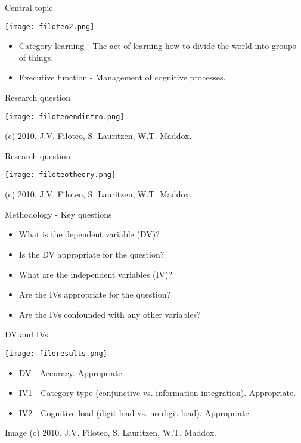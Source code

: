 \documentclass{beamer}
\begin{document}
\begin{frame}{Central topic}

\centerline{\texttt{[image: filoteo2.png]}}


\begin{itemize}
\item Category learning - The act of learning how to divide the world into groups of things.
\item Executive function - Management of cognitive processes.
\end{itemize}

\end{frame}



\begin{frame}{Research question}

\centerline{\texttt{[image: filoteoendintro.png]}}
\tiny (c) 2010. J.V. Filoteo, S. Lauritzen, W.T. Maddox. 
\end{frame}



\begin{frame}{Research question}

\centerline{\texttt{[image: filoteotheory.png]}}
\tiny (c) 2010. J.V. Filoteo, S. Lauritzen, W.T. Maddox. 
\end{frame}



\begin{frame}{Methodology - Key questions}

\begin{itemize}
\item What is the dependent variable (DV)? 
\item Is the DV appropriate for the question?
\item What are the independent variables (IV)?
\item Are the IVs appropriate for the question?
\item Are the IVs confounded with any other variables?
\end{itemize}

\end{frame}



\begin{frame}{DV and IVs}

\centerline{\texttt{[image: filoresults.png]}}

\begin{itemize}
\item DV - Accuracy. Appropriate.
\item IV1 - Category type (conjunctive vs. information integration). Appropriate.
\item IV2 - Cognitive load (digit load vs. no digit load). Appropriate.
\end{itemize}

\tiny Image (c) 2010. J.V. Filoteo, S. Lauritzen, W.T. Maddox.

\end{frame}
\end{document}
